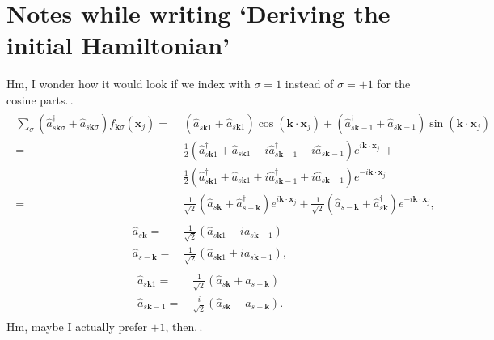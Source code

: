 \documentclass{report}
\begin{document}
\section{Notes while writing `Deriving the initial Hamiltonian'}
Hm, I wonder how it would look if we index with $\sigma = 1$ instead of $\sigma = +1$ for the cosine parts.\,.
\begin{align}
\begin{aligned}
	\sum_{\sigma}
	(\hat a_{s\boldsymbol{k}\sigma}^\dagger + \hat a_{s\boldsymbol{k}\sigma})
	f_{\boldsymbol{k}\sigma}(\boldsymbol{x}_j)
	=&\,\,
	(\hat a_{s\boldsymbol{k}1}^\dagger + \hat a_{s\boldsymbol{k}1})
		\cos(\boldsymbol{k}\cdot\boldsymbol{x}_j) +
	(\hat a_{s\boldsymbol{k}-1}^\dagger + \hat a_{s\boldsymbol{k}-1}) 
		\sin(\boldsymbol{k}\cdot\boldsymbol{x}_j)
	\\=&\,\,
	\frac{1}{2}
	(\hat a_{s\boldsymbol{k}1}^\dagger + \hat a_{s\boldsymbol{k}1} - 
	i\hat a_{s\boldsymbol{k}-1}^\dagger - i\hat a_{s\boldsymbol{k}-1})
		e^{i\boldsymbol{k}\cdot\boldsymbol{x}_j} \,+
	\\\phantom{=}&\,\,
	\frac{1}{2}
	(\hat a_{s\boldsymbol{k}1}^\dagger + \hat a_{s\boldsymbol{k}1} + 
	i\hat a_{s\boldsymbol{k}-1}^\dagger + i\hat a_{s\boldsymbol{k}-1})
		e^{-i\boldsymbol{k}\cdot\boldsymbol{x}_j}
	\\=&\,\,
	\frac{1}{\sqrt{2}}
	(\hat a_{s\boldsymbol{k}} + \hat a_{s-\boldsymbol{k}}^\dagger)
		e^{i\boldsymbol{k}\cdot\boldsymbol{x}_j} +
	\frac{1}{\sqrt{2}}
	(\hat a_{s-\boldsymbol{k}} + \hat a_{s\boldsymbol{k}}^\dagger)
		e^{-i\boldsymbol{k}\cdot\boldsymbol{x}_j},
\end{aligned}
\end{align}
\begin{align}
\begin{aligned}
	\hat a_{s\boldsymbol{k}} =&\, 
		\frac{1}{\sqrt{2}} (\hat a_{s\boldsymbol{k}1} - i a_{s\boldsymbol{k}-1})
	\\
	\hat a_{s-\boldsymbol{k}} =&\, 
		\frac{1}{\sqrt{2}} (\hat a_{s\boldsymbol{k}1} + i a_{s\boldsymbol{k}-1}),
\end{aligned}
\end{align}
\begin{align}
\begin{aligned}
	\hat a_{s\boldsymbol{k}1} =&\, 
		\frac{1}{\sqrt{2}} (\hat a_{s\boldsymbol{k}} + a_{s-\boldsymbol{k}})
	\\
	\hat a_{s\boldsymbol{k}-1} =&\, 
		\frac{i}{\sqrt{2}} (\hat a_{s\boldsymbol{k}} - a_{s-\boldsymbol{k}}).
\end{aligned}
\end{align}
Hm, maybe I actually prefer $+1$, then.\,. 
\end{document}
